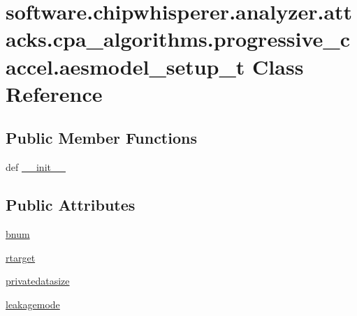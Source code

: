 \hypertarget{classsoftware_1_1chipwhisperer_1_1analyzer_1_1attacks_1_1cpa__algorithms_1_1progressive__caccel_1_1aesmodel__setup__t}{}\section{software.\+chipwhisperer.\+analyzer.\+attacks.\+cpa\+\_\+algorithms.\+progressive\+\_\+caccel.\+aesmodel\+\_\+setup\+\_\+t Class Reference}
\label{classsoftware_1_1chipwhisperer_1_1analyzer_1_1attacks_1_1cpa__algorithms_1_1progressive__caccel_1_1aesmodel__setup__t}
\subsection*{Public Member Functions}
\begin{DoxyCompactItemize}
\item 
def \hyperlink{classsoftware_1_1chipwhisperer_1_1analyzer_1_1attacks_1_1cpa__algorithms_1_1progressive__caccel_1_1aesmodel__setup__t_a31a2a67b0b4d9462b39d74a784b03dac}{\+\_\+\+\_\+init\+\_\+\+\_\+}
\end{DoxyCompactItemize}
\subsection*{Public Attributes}
\begin{DoxyCompactItemize}
\item 
\hyperlink{classsoftware_1_1chipwhisperer_1_1analyzer_1_1attacks_1_1cpa__algorithms_1_1progressive__caccel_1_1aesmodel__setup__t_abf44dc3571e7ad75f3277ff2b83c1e6d}{bnum}
\item 
\hyperlink{classsoftware_1_1chipwhisperer_1_1analyzer_1_1attacks_1_1cpa__algorithms_1_1progressive__caccel_1_1aesmodel__setup__t_a3ad257635994aa156846fad633055ed9}{rtarget}
\item 
\hyperlink{classsoftware_1_1chipwhisperer_1_1analyzer_1_1attacks_1_1cpa__algorithms_1_1progressive__caccel_1_1aesmodel__setup__t_a4d2f13a55620262284f663322a658cfd}{privatedatasize}
\item 
\hyperlink{classsoftware_1_1chipwhisperer_1_1analyzer_1_1attacks_1_1cpa__algorithms_1_1progressive__caccel_1_1aesmodel__setup__t_ab986601acded7f406326a8c326f1681a}{leakagemode}
\end{DoxyCompactItemize}
